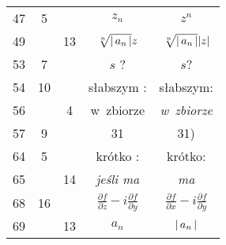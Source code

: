 \documentclass[a4paper,11pt]{article}
\begin{document}
\begin{center}
\begin{tabular}{|c|c|c|c|c|}
    47 & \hphantom{0}5 & & $z_{ n }$ & $z^{ n }$ \\
    49 & & 13 & $\sqrt[n]{ |\, {  a_{ n }  } \,| } z$
           & $\sqrt[n]{ |\, {  a_{ n }  } \,| } | z |$ \\
    53 & \hphantom{0}7 & & $s$ ? & $s$? \\
    54 & 10 & & słabszym : & słabszym: \\
    56 & & \hphantom{0}4 & w~zbiorze & \textit{w~zbiorze} \\
    57 & \hphantom{0}9 & & 31 & 31) \\
    64 & \hphantom{0}5 & & krótko : & krótko: \\
    65 & & 14 & \textit{jeśli ma} & \textit{ma} \\
    68 & 16 & & $\frac{ \partial f }{ \partial z } - i \frac{ \partial f }{ \partial y }$
          & $\frac{ \partial f }{ \partial x } - i \frac{ \partial f }{ \partial y }$ \\
    69 & & 13 & $a_{ n }$ & $|\, {  a_{ n }  } \,|$ \\
    \hline
  \end{tabular}





  \newpage


\end{center}
\end{document}
